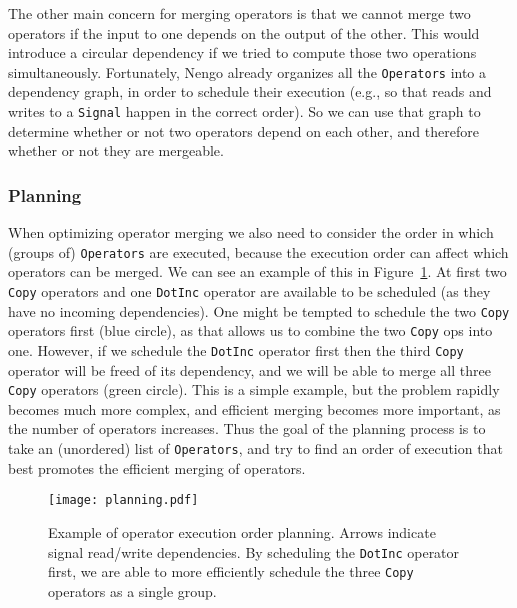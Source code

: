 \documentclass{article}
\begin{document}
The other main concern for merging operators is that we cannot merge two operators if the input to one depends on the output of the other.  This would introduce a circular dependency if we tried to compute those two operations simultaneously.  Fortunately, Nengo already organizes all the \texttt{Operators} into a dependency graph, in order to schedule their execution (e.g., so that reads and writes to a \texttt{Signal} happen in the correct order).  So we can use that graph to determine whether or not two operators depend on each other, and therefore whether or not they are mergeable.

\subsubsection{Planning}
\label{sec:planning}

When optimizing operator merging we also need to consider the order in which (groups of) \texttt{Operators} are executed, because the execution order can affect which operators can be merged.  We can see an example of this in Figure~\ref{fig:planning}.  At first two \texttt{Copy} operators and one \texttt{DotInc} operator are available to be scheduled (as they have no incoming dependencies).  One might be tempted to schedule the two \texttt{Copy} operators first (blue circle), as that allows us to combine the two \texttt{Copy} ops into one.  However, if we schedule the \texttt{DotInc} operator first then the third \texttt{Copy} operator will be freed of its dependency, and we will be able to merge all three \texttt{Copy} operators (green circle).  This is a simple example, but the problem rapidly becomes much more complex, and efficient merging becomes more important, as the number of operators increases.  Thus the goal of the planning process is to take an (unordered) list of \texttt{Operators}, and try to find an order of execution that best promotes the efficient merging of operators.

\begin{figure}
\centering
\texttt{[image: planning.pdf]}
\caption{Example of operator execution order planning.  Arrows indicate signal read/write dependencies.  By scheduling the \texttt{DotInc} operator first, we are able to more efficiently schedule the three \texttt{Copy} operators as a single group.}
\label{fig:planning}
\end{figure}
\end{document}
